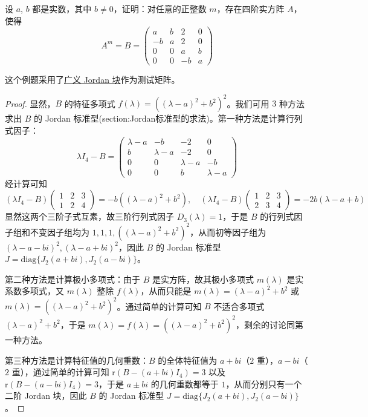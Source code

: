 \documentclass[../../main.tex]{subfiles}
\begin{document}
\begin{example}
设 $a$, $b$ 都是实数，其中 $b\neq 0$，证明：对任意的正整数 $m$，存在四阶实方阵 $A$，使得
\[
A^m = B = 
\begin{pmatrix}
a & b & 2 & 0 \\
-b & a & 2 & 0 \\
0 & 0 & a & b \\
0 & 0 & -b & a
\end{pmatrix}
\]
\end{example}
\begin{remark}
这个例题采用了\hyperref[theorem:实数域上的广义Jordan标准型]{广义 Jordan 块}作为测试矩阵。
\end{remark}
\begin{proof}
显然，$B$ 的特征多项式 $f(\lambda) = ((\lambda - a)^2 + b^2)^2$。我们可用 $3$ 种方法求出 $B$ 的 Jordan 标准型(section:Jordan标准型的求法)。第一种方法是计算行列式因子：
\[
\lambda I_4 - B = 
\begin{pmatrix}
\lambda - a & -b & -2 & 0 \\
b & \lambda - a & -2 & 0 \\
0 & 0 & \lambda - a & -b \\
0 & 0 & b & \lambda - a
\end{pmatrix}
\]
经计算可知
\[
(\lambda I_4 - B)\begin{pmatrix}1&2&3\\1&2&4\end{pmatrix} = -b((\lambda - a)^2 + b^2), \quad (\lambda I_4 - B)\begin{pmatrix}1&2&3\\2&3&4\end{pmatrix} = -2b(\lambda - a + b)
\]
显然这两个三阶子式互素，故三阶行列式因子 $D_3(\lambda) = 1$，于是 $B$ 的行列式因子组和不变因子组均为 $1,1,1,((\lambda - a)^2 + b^2)^2$，从而初等因子组为 $(\lambda - a - bi)^2,(\lambda - a + bi)^2$，因此 $B$ 的 Jordan 标准型 $J = \mathrm{diag}\{J_2(a + bi),J_2(a - bi)\}$。

第二种方法是计算极小多项式：由于 $B$ 是实方阵，故其极小多项式 $m(\lambda)$ 是实系数多项式，又 $m(\lambda)$ 整除 $f(\lambda)$，从而只能是 $m(\lambda) = (\lambda - a)^2 + b^2$ 或 $m(\lambda) = ((\lambda - a)^2 + b^2)^2$。通过简单的计算可知 $B$ 不适合多项式 $(\lambda - a)^2 + b^2$，于是 $m(\lambda) = f(\lambda) = ((\lambda - a)^2 + b^2)^2$，剩余的讨论同第一种方法。

第三种方法是计算特征值的几何重数：$B$ 的全体特征值为 $a + bi$（$2$ 重），$a - bi$（$2$ 重），通过简单的计算可知 $\mathrm{r}(B - (a + bi)I_4) = 3$ 以及 $\mathrm{r}(B - (a - bi)I_4) = 3$，于是 $a\pm bi$ 的几何重数都等于 $1$，从而分别只有一个二阶 Jordan 块，因此 $B$ 的 Jordan 标准型 $J = \mathrm{diag}\{J_2(a + bi),J_2(a - bi)\}$。


\end{proof}
\end{document}
